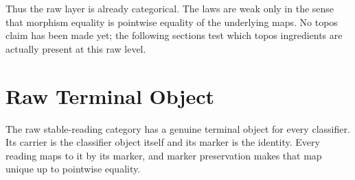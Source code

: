 \documentclass[11pt]{article}
\begin{document}
Thus the raw layer is already categorical.  The laws are weak only in
the sense that morphism equality is pointwise equality of the
underlying maps.  No topos claim has been made yet; the following
sections test which topos ingredients are actually present at this raw
level.

\section{Raw Terminal Object}

The raw stable-reading category has a genuine terminal object for every
classifier.  Its carrier is the classifier object itself and its marker
is the identity.  Every reading maps to it by its marker, and marker
preservation makes that map unique up to pointwise equality.

\begin{code}%
\>[0]\<%
\\
\>[0]\AgdaSpace{}%
\AgdaSpace{}%
\AgdaSymbol{(}\AgdaSpace{}%
\AgdaSymbol{:}\AgdaSpace{}%
\AgdaSymbol{)}\AgdaSpace{}%
\AgdaSymbol{:}\AgdaSpace{}%
\AgdaSpace{}%
\<%
\\
\>[0][@{}l@{\AgdaIndent{0}}]%
\>[2]\<%
\\
\>[2][@{}l@{\AgdaIndent{0}}]%
\>[4]\AgdaSpace{}%
\AgdaSymbol{:}\AgdaSpace{}%
\AgdaSpace{}%
\<%
\\
%
\>[4]%
\>[15]\AgdaSymbol{:}%
\>[1388I]\AgdaSymbol{(}\AgdaSpace{}%
\AgdaSymbol{:}\AgdaSpace{}%
\AgdaSpace{}%
\AgdaSymbol{)}\AgdaSpace{}%
\<%
\\
\>[.][@{}l@{}]\<[1388I]%
\>[17]\AgdaSpace{}%
\AgdaSpace{}%
\AgdaSpace{}%
\<%
\\
%
\>[4]\AgdaSpace{}%
\AgdaSymbol{:}%
\>[1397I]\AgdaSymbol{\{}\AgdaSpace{}%
\AgdaSymbol{:}\AgdaSpace{}%
\AgdaSpace{}%
\AgdaSymbol{\}}\AgdaSpace{}%
\<%
\\
\>[.][@{}l@{}]\<[1397I]%
\>[17]\AgdaSymbol{(}\AgdaSpace{}%

\end{code}
\end{document}
